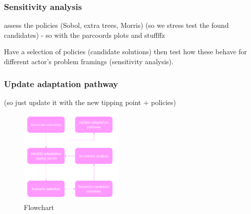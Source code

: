 \subsubsection{Sensitivity analysis}
assess the policies (Sobol, extra trees, Morris) (so we stress test the found candidates) - so with the parcoords plots and stuffffz

Have a selection of policies (candidate solutions) then test how these behave for different actor's problem framings (sensitivity analysis).

\subsubsection{Update adaptation pathway}
(so just update it with the new tipping point + policies)

\begin{figure}[h!]
    \centering
    \includegraphics[width=0.45\textwidth]{report/figures/flowchart.png} 
    \caption{Flowchart}
    \label{fig:flowchart}
\end{figure}









